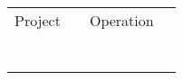 \documentclass{standalone}
\begin{document}
\begin{tabular}{p{4cm} p{4cm} | p{4cm} p{4cm} }
\large Project & & \large Operation & \\
& & & \\
& & & \\
& & & \\
& & & \\
& & & \\
& & & \\
& & & \\
\end{tabular}
\end{document}
